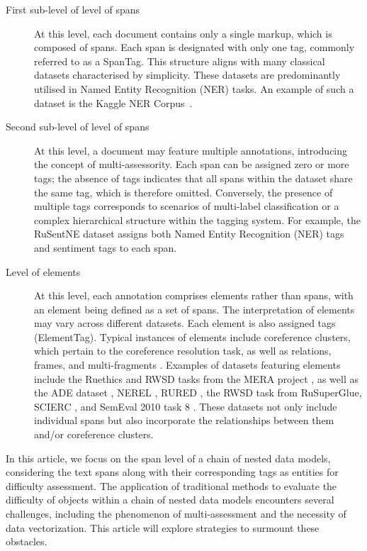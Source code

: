 \documentclass{article}
\begin{document}
\begin{description}
    \item[First sub-level of level of spans] At this level, each document contains only a single markup, which is composed of spans. Each span is designated with only one tag, commonly referred to as a SpanTag. This structure aligns with many classical datasets characterised by simplicity. These datasets are predominantly utilised in Named Entity Recognition (NER) tasks. An example of such a dataset is the Kaggle NER Corpus~\cite{kagglener}.
    \item[Second sub-level of level of spans] At this level, a document may feature multiple annotations, introducing the concept of multi-assessority. Each span can be assigned zero or more tags; the absence of tags indicates that all spans within the dataset share the same tag, which is therefore omitted. Conversely, the presence of multiple tags corresponds to scenarios of multi-label classification or a complex hierarchical structure within the tagging system. For example, the RuSentNE dataset \cite{rusentne} assigns both Named Entity Recognition (NER) tags and sentiment tags to each span.
    \item[Level of elements] At this level, each annotation comprises elements rather than spans, with an element being defined as a set of spans. The interpretation of elements may vary across different datasets. Each element is also assigned tags (ElementTag). Typical instances of elements include coreference clusters, which pertain to the coreference resolution task, as well as relations, frames, and multi-fragments \cite{10893762}. Examples of datasets featuring elements include the Ruethics and RWSD tasks from the MERA project \cite{fenogenova-etal-2024-mera}, as well as the ADE dataset \cite{ade}, NEREL \cite{nerel}, RURED \cite{rured}, the RWSD task from RuSuperGlue, SCIERC \cite{scierc}, and SemEval 2010 task 8 \cite{hendrickx2019semeval}. These datasets not only include individual spans but also incorporate the relationships between them and/or coreference clusters.
\end{description}

In this article, we focus on the span level of a chain of nested data models, considering the text spans along with their corresponding tags as entities for difficulty assessment. The application of traditional methods to evaluate the difficulty of objects within a chain of nested data models encounters several challenges, including the phenomenon of multi-assessment and the necessity of data vectorization. This article will explore strategies to surmount these obstacles.
\end{document}
